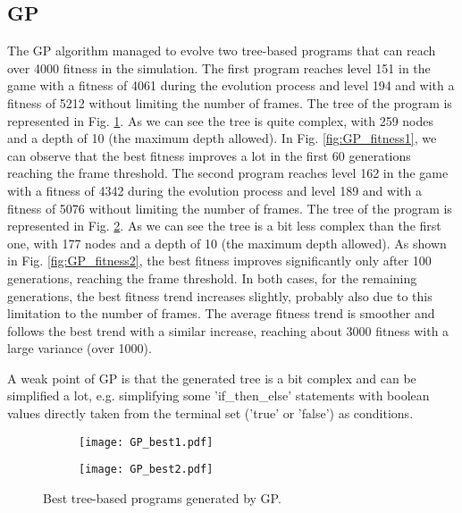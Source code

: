 \subsection{GP}
The GP algorithm managed to evolve two tree-based programs that can reach over 4000 fitness in the simulation.
The first program reaches level 151 in the
game with a fitness of 4061 during the evolution process and level 194 and with a fitness of 5212
without limiting the number of frames. The tree of the program is represented in Fig. \ref{fig:GP_best1}. As
we can see the tree is quite complex, with 259 nodes and a depth of 10 (the maximum depth
allowed). In Fig. \ref{fig:GP_fitness1}, we can observe that the best fitness improves a lot in the first 60
generations reaching the frame threshold.
The second program reaches level 162 in the game with a fitness of 4342 during the evolution process and 
level 189 and with a fitness of 5076 without limiting the number of frames. The tree of the program is 
represented in Fig. \ref{fig:GP_best2}. As we can see the tree is a bit less complex than the first one, with 177 nodes 
and a depth of 10 (the maximum depth allowed). As shown in Fig. \ref{fig:GP_fitness2}, the best fitness improves significantly 
only after 100 generations, reaching the frame threshold.
In both cases, for the remaining generations, the best fitness trend increases slightly, probably also due 
to this limitation to the number of frames. The average fitness trend is smoother and follows the best trend 
with a similar increase, reaching about 3000 fitness with a large variance (over 1000).

A weak point of GP is that the generated tree is a bit complex and can be simplified a lot,
e.g. simplifying some 'if\_then\_else' statements with boolean values directly taken from the
terminal set ('true' or 'false') as conditions.

\begin{figure*}[t!]
    \centering
    \begin{subfigure}[b]{0.45\textwidth}
        \centering
        \texttt{[image: GP\_best1.pdf]}
        \caption{}
        \label{fig:GP_best1}
    \end{subfigure}
    \hspace{1mm}
    \begin{subfigure}[b]{0.45\textwidth}
        \centering
        \texttt{[image: GP\_best2.pdf]}
        \caption{}
        \label{fig:GP_best2}
    \end{subfigure}
       \caption{Best tree-based programs generated by GP.}
       \label{fig:GP_best}
\end{figure*}



